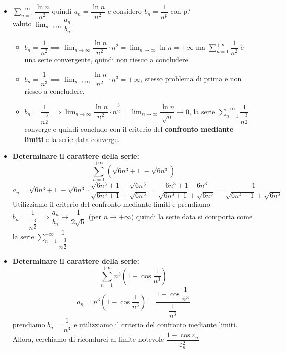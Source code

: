 \documentclass[../../main.tex]{subfiles}
\begin{document}
\begin{itemize}
    \item $\sum_{n=1}^{+\infty} \dfrac{\ln n}{n^2} $
          quindi $a_n = \dfrac{\ln n}{n^2}$ e considero $b_n = \dfrac{1}{n^p}$ con p?\\
          valuto $\lim_{n\to\infty}\dfrac{a_n}{b_n}$
          \begin{itemize}
              \item $b_n = \dfrac{1}{n^2} \implies \lim_{n\to\infty} \dfrac{\ln{n}}{n^2} \cdot n^2 = \lim_{n\to\infty}\ln n = +\infty$ ma $\sum_{n=1}^{+\infty}\dfrac{1}{n^2}$ è una serie convergente, quindi non riesco a concludere.
              \item $b_n = \dfrac{1}{n^3} \implies \lim_{n\to\infty} \dfrac{\ln n}{n^2} \cdot n^3 = +\infty$, stesso problema di prima e non riesco a concludere.
              \item $b_n = \dfrac{1}{n^{\dfrac{3}{2}}} \implies \lim_{n\to\infty} \dfrac{\ln n}{n^2} \cdot n^{\dfrac{3}{2}} = \lim_{n\to\infty} \dfrac{\ln n}{\sqrt{n}} \to 0$, la serie $\sum_{n=1}^{+\infty}\dfrac{1}{n^{\dfrac{3}{2}}}$ converge e quindi concludo con il criterio del \textbf{confronto mediante limiti} e la serie data converge.
          \end{itemize}
    \item \textbf{Determinare il carattere della serie:}
          \[
              \sum_{n=1}^{+\infty}(\sqrt{6n^3+1} - \sqrt{6n^3})
          \]
          \[
              a_n = \sqrt{6n^3+1} - \sqrt{6n^3} \cdot \dfrac{\sqrt{6n^3+1} + \sqrt{6n^3}}{\sqrt{6n^3+1} + \sqrt{6n^3}} = \dfrac{6n^3+1-6n^3}{\sqrt{6n^3+1} + \sqrt{6n^3}} = \dfrac{1}{\sqrt{6n^3+1} + \sqrt{6n^3}}
          \]
          Utilizziamo il criterio del confronto mediante limiti e prendiamo $b_n =
              \dfrac{1}{n^{\dfrac{3}{2}}} \implies \dfrac{a_n}{b_n} \rightarrow
              \dfrac{1}{2\sqrt{6}}$ (per $n\to+\infty$) quindi la serie data si comporta come
          la serie $\sum_{n=1}^{+\infty} \dfrac{1}{n^{\dfrac{3}{2}}}$
    \item \textbf{Determinare il carattere della serie:}
          \[
              \sum_{n=1}^{+\infty} n^3(1-\cos\dfrac{1}{n^3})
          \]
          \[
              a_n = n^3(1-\cos\dfrac{1}{n^3}) = \dfrac{1-\cos{\dfrac{1}{n^3}}}{\dfrac{1}{n^3}}
          \]
          prendiamo $b_n = \dfrac{1}{n^3}$ e utilizziamo il criterio del confronto
          mediante limiti. Allora, cerchiamo di ricondurci al limite notevole
          $\dfrac{1-\cos{\varepsilon_n}}{\varepsilon_n^2}$
          \[
\]
\end{itemize}
\end{document}
